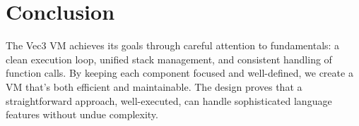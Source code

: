 \section{Conclusion}
The Vec3 VM achieves its goals through careful attention to fundamentals: a clean execution loop, unified stack management, and consistent handling of function calls. By keeping each component focused and well-defined, we create a VM that's both efficient and maintainable. The design proves that a straightforward approach, well-executed, can handle sophisticated language features without undue complexity.
